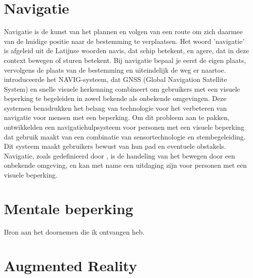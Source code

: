 \section{Navigatie}
\label{sec:navigatie}

Navigatie is de kunst van het plannen en volgen van een route om zich daarmee van de huidige positie naar de bestemming te verplaatsen. Het woord 'navigatie' is afgeleid uit de Latijnse woorden navis, dat schip betekent, en agere, dat in deze context bewegen of sturen betekent. Bij navigatie bepaal je eerst de eigen plaats, vervolgens de plaats van de bestemming en uiteindelijk de weg er naartoe. \textcite{Katz2010} introduceerde het NAVIG-systeem, dat GNSS (Global Navigation Satellite System) en snelle visuele herkenning combineert om gebruikers met een visuele beperking te begeleiden in zowel bekende als onbekende omgevingen. Deze systemen benadrukken het belang van technologie voor het verbeteren van navigatie voor mensen met een beperking. Om dit probleem aan te pakken, ontwikkelden \textcite{Lakde2015} een navigatiehulpsysteem voor personen met een visuele beperking dat gebruik maakt van een combinatie van sensortechnologie en stembegeleiding. Dit systeem maakt gebruikers bewust van hun pad en eventuele obstakels. Navigatie, zoals gedefinieerd door \textcite{Gachet2010}, is de handeling van het bewegen door een onbekende omgeving, en kan met name een uitdaging zijn voor personen met een visuele beperking.

\section{Mentale beperking}
\label{sec:mentale-beperking}

Bron aan het doornemen die ik ontvangen heb.

\section{Augmented Reality}
\label{sec:augmented-reality}

